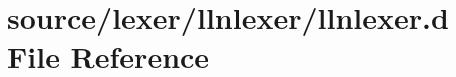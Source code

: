 \hypertarget{llnlexer_8d}{\section{source/lexer/llnlexer/llnlexer.d File Reference}
\label{llnlexer_8d}
}
